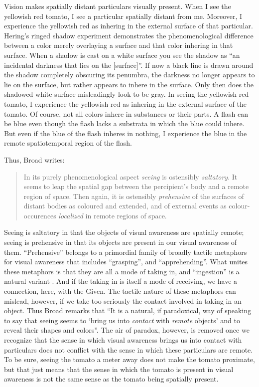 \documentclass[12pt]{article}
\begin{document}
Vision makes spatially distant particulars visually present. When I see the yellowish red tomato, I see a particular spatially distant from me. Moreover, I experience the yellowish red as inhering in the external surface of that particular. Hering's \citeyearpar[8]{Hering:1920ty} ringed shadow experiment demonstrates the phenomenological difference between a color merely overlaying a surface and that color inhering in that surface. When a shadow is cast on a white surface you see the shadow as ``an incidental darkness that lies on the [surface]''. If now a black line is drawn around the shadow completely obscuring its penumbra, the darkness no longer appears to lie on the surface, but rather appears to inhere in the surface. Only then does the shadowed white surface misleadingly look to be gray. In seeing the yellowish red tomato, I experience the yellowish red as inhering in the external surface of the tomato. Of course, not all colors inhere in substances or their parts. A flash can be blue even though the flash lacks a substrata in which the blue could inhere. But even if the blue of the flash inheres in nothing, I experience the blue in the remote spatiotemporal region of the flash. 

Thus, Broad writes:
\begin{quote}
    In its purely phenomenological aspect \emph{seeing} is ostensibly \emph{saltatory}. It seems to leap the spatial gap between the percipient's body and a remote region of space. Then again, it is ostensibly \emph{prehensive} of the surfaces of distant bodies as coloured and extended, and of external events as colour-occurences \emph{localized} in remote regions of space. \citep[32]{Broad:1965dq}
\end{quote}
Seeing is saltatory in that the objects of visual awareness are spatially remote; seeing is prehensive in that its objects are present in our visual awareness of them. ``Prehensive'' belongs to a primordial family of broadly tactile metaphors for visual awareness that includes ``grasping'', and ``apprehending''. What unites these metaphors is that they are all a mode of taking in, and ``ingestion'' is a natural variant \citep[see][]{Johnston:2006uq}. And if the taking in is itself a mode of receiving, we have a connection, here, with the Given. The tactile nature of these metaphors can mislead, however, if we take too seriously the contact involved in taking in an object. Thus Broad remarks that ``It is a natural, if paradoxical, way of speaking to say that seeing seems to `bring us into \emph{contact} with \emph{remote} objects' and to reveal their shapes and colors''. The air of paradox, however, is removed once we recognize that the sense in which visual awareness brings us into contact with particulars does not conflict with the sense in which these particulars are remote. To be sure, seeing the tomato a meter away does not make the tomato proximate, but that just means that the sense in which the tomato is present in visual awareness is not the same sense as the tomato being spatially present.
\end{document}
